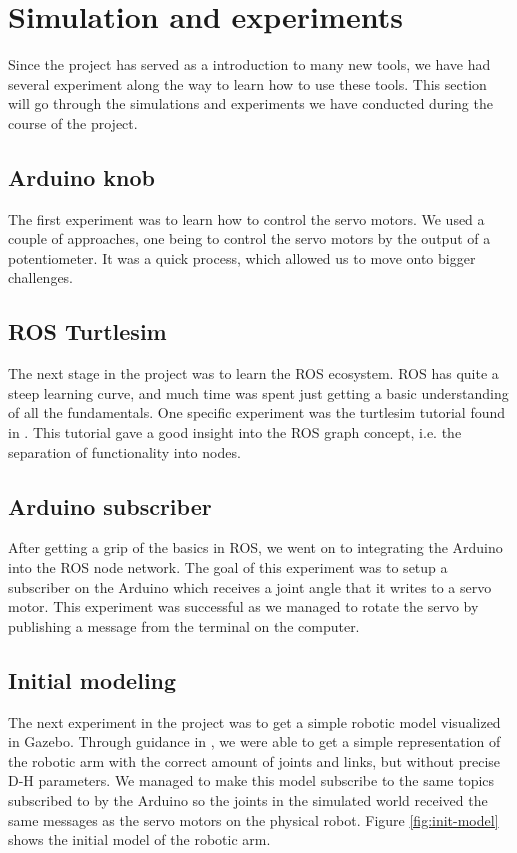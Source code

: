 \documentclass[11pt,a4paper, titlepage]{article}
\begin{document}
		
	\section{Simulation and experiments}
	\label{simex}
	Since the project has served as a introduction to many new tools, we have had several experiment along the way to learn how to use these tools. This section will go through the simulations and experiments we have conducted during the course of the project.
	
	\subsection{Arduino knob}
	The first experiment was to learn how to control the servo motors. We used a couple of approaches, one being to control the servo motors by the output of a potentiometer. It was a quick process, which allowed us to move onto bigger challenges.
	
	\subsection{ROS Turtlesim}
	The next stage in the project was to learn the ROS ecosystem. ROS has quite a steep learning curve, and much time was spent just getting a basic understanding of all the fundamentals. One specific experiment was the turtlesim tutorial found in \cite{turtle2017}. This tutorial gave a good insight into the ROS graph concept, i.e. the separation of functionality into nodes.
	
	\subsection{Arduino subscriber}
	After getting a grip of the basics in ROS, we went on to integrating the Arduino into the ROS node network. The goal of this experiment was to setup a subscriber on the Arduino which receives a joint angle that it writes to a servo motor. This experiment was successful as we managed to rotate the servo by publishing a message from the terminal on the computer.
	
	\subsection{Initial modeling}
	The next experiment in the project was to get a simple robotic model visualized in Gazebo. Through guidance in \cite{joseph2015}, we were able to get a simple representation of the robotic arm with the correct amount of joints and links, but without precise D-H parameters. We managed to make this model subscribe to the same topics subscribed to by the Arduino so the joints in the simulated world received the same messages as the servo motors on the physical robot. Figure \ref{fig:init-model} shows the initial model of the robotic arm.
	
\end{document}
